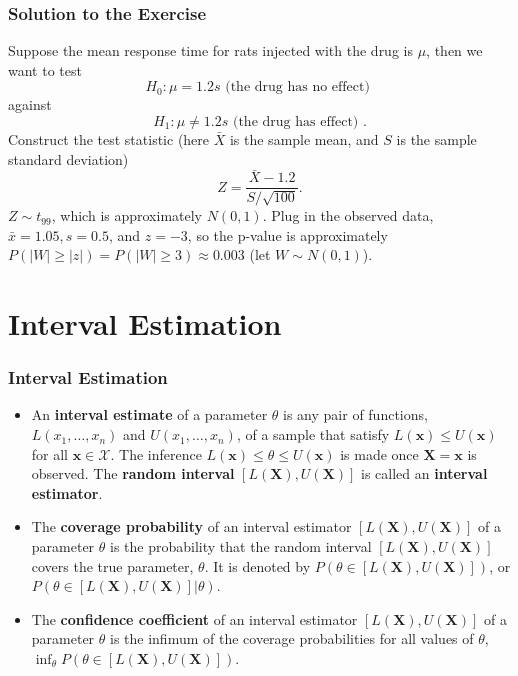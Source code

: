 \documentclass{beamer}
\begin{document}
\begin{frame}
\frametitle{Solution to the Exercise}
Suppose the mean response time for rats injected with the drug is $\mu$, then we want to test
$$
H_0: \mu = 1.2s \text{ (the drug has no effect) }
$$
against
$$
H_1: \mu \neq 1.2s \text{ (the drug has effect) }.
$$
Construct the test statistic (here $\bar{X}$ is the sample mean, and $S$ is the sample standard deviation)
$$
Z = \frac{\bar{X} - 1.2}{S/\sqrt{100}}.
$$
$Z \sim t_{99}$, which is approximately $N(0,1)$. Plug in the observed data, $\bar{x} = 1.05, s = 0.5$, and $z=-3$, so the p-value is approximately $P(\vert W \vert \geq \vert z \vert) = P(\vert W \vert \geq 3) \approx 0.003$ (let $W \sim N(0,1)$).%
\end{frame}


\section{Interval Estimation}
\begin{frame}
\frametitle{Interval Estimation}
\begin{itemize}
\item An \textbf{interval estimate} of a parameter $\theta$ is any pair of functions, $L(x_1,\ldots,x_n)$ and $U(x_1,\ldots,x_n)$, of a sample that satisfy $L(\mathbf{x}) \leq U(\mathbf{x})$ for all $\mathbf{x} \in \mathcal{X}$. The inference $L(\mathbf{x}) \leq \theta \leq U(\mathbf{x})$ is made once $\mathbf{X} = \mathbf{x}$ is observed. The \textbf{random interval} $[L(\mathbf{X}),U(\mathbf{X})]$ is called an \textbf{interval estimator}.
\item The \textbf{coverage probability} of an interval estimator $[L(\mathbf{X}),U(\mathbf{X})]$ of a parameter $\theta$ is the probability that the random interval $[L(\mathbf{X}),U(\mathbf{X})]$ covers the true parameter, $\theta$. It is denoted by $P(\theta \in [L(\mathbf{X}),U(\mathbf{X})])$, or $P(\theta \in [L(\mathbf{X}),U(\mathbf{X})]|\theta)$.
\item The \textbf{confidence coefficient} of an interval estimator $[L(\mathbf{X}),U(\mathbf{X})]$ of a parameter $\theta$ is the infimum of the coverage probabilities for all values of $\theta$, $\inf_{\theta}P(\theta \in [L(\mathbf{X}),U(\mathbf{X})])$.
\end{itemize}
\end{frame}
\end{document}
